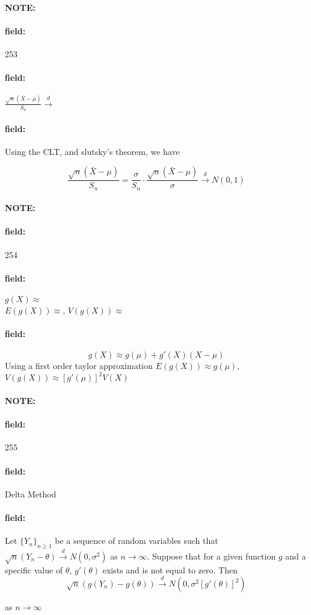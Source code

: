 \documentclass[12pt]{article}
\newenvironment{note}{\paragraph{NOTE:}}{}
\newenvironment{field}{\paragraph{field:}}{}
\begin{document}
\begin{note} \begin{field} \tiny 253 \end{field}
  \begin{field}
    $\frac{\sqrt{n}(\bar{X} - \mu)}{S_n} \overset{d}{\to} $
  \end{field}
  \begin{field}
    Using the CLT, and slutsky's theorem, we have

    $$\frac{\sqrt{n}(\bar{X} - \mu)}{S_n} = \frac{\sigma}{S_n}\cdot \frac{\sqrt{n}(\bar{X} - \mu)}{\sigma} \overset{d}{\to} N(0,1) $$
  \end{field}
\end{note}

\begin{note} \begin{field} \tiny 254 \end{field}
  \begin{field}
    $ g(X) \approx $ \\
$E(g(X)) \approx $, $V(g(X))\approx $
  \end{field}
  \begin{field}
    $$ g(X) \approx g(\mu) + g'(X)(X-\mu)$$ Using a first order taylor approximation
    $E(g(X)) \approx g(\mu)$, $V(g(X))\approx [g'(\mu)]^2V(X)$
  \end{field}
\end{note}

\begin{note} \begin{field} \tiny 255 \end{field}
  \begin{field}
    Delta Method
  \end{field}
  \begin{field}
    Let $\{Y_n\}_{n \geq 1}$ be a sequence of random variables such that $\sqrt{n}(Y_n - \theta) \overset{d}{\to} N(0,\sigma^2)$ as $n \to \infty$. Suppose that for a given function $g$ and a specific value of $\theta$, $g'(\theta)$ exists and is not equal to zero. Then
    $$\sqrt{n}(g(Y_n) - g(\theta)) \overset{d}{\to} N(0,\sigma^2[g'(\theta)]^2)$$

    as $n\to \infty$
  \end{field}
\end{note}
\end{document}
